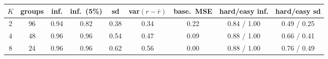 \begin{tabular}{@{}cccccccc c@{}}
\toprule
$K$ & groups & inf. & inf.\ (5\%) & sd & var$(r-\bar r)$ & base.\ MSE & hard/easy inf. & hard/easy sd \\
\midrule
2 & 96 & 0.94 & 0.82 & 0.38 & 0.34 & 0.22 & 0.84 / 1.00 & 0.49 / 0.25 \\
4 & 48 & 0.96 & 0.96 & 0.54 & 0.47 & 0.09 & 0.88 / 1.00 & 0.66 / 0.41 \\
8 & 24 & 0.96 & 0.96 & 0.62 & 0.56 & 0.00 & 0.88 / 1.00 & 0.76 / 0.49 \\
\bottomrule
\end{tabular}
